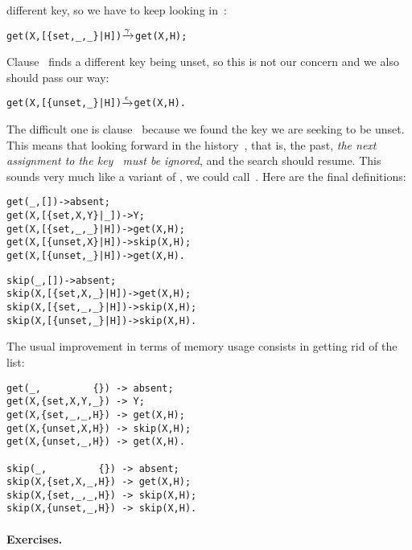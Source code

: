 different key, so we have to keep looking in~:
\begin{alltt}
get(X,[\{set,_,_\}|H]) \(\smashedrightarrow{\gamma}\) get(X,H);
\end{alltt}
Clause~\clause{\epsilon} finds a different key being unset, so this is
not our concern and we also should pass our way:
\begin{alltt}
get(X,[\{unset,_\}|H]) \(\smashedrightarrow{\epsilon}\) get(X,H).
\end{alltt}
The difficult one is clause~\clause{\delta} because we found the key
we are seeking to be unset. This means that looking forward in the
history~, that is, the past, \emph{the next assignment to
  the key~ must be ignored}, and the search should
resume. This sounds very much like a variant of , we
could call~. Here are the final definitions:
\begin{alltt}
get(_,           []) -> absent;
get(X,[\{set,X,Y\}|_]) -> Y;
get(X,[\{set,_,_\}|H]) -> get(X,H);
get(X,[\{unset,X\}|H]) -> skip(X,H);\hfill% \emph{Skip the next} set...
get(X,[\{unset,_\}|H]) -> get(X,H).

skip(_,           []) -> absent;
skip(X,[\{set,X,_\}|H]) -> get(X,H);
skip(X,[\{set,_,_\}|H]) -> skip(X,H);\hfill% \emph{...done.}
skip(X,[\{unset,_\}|H]) -> skip(X,H).
\end{alltt}
The usual improvement in terms of memory usage consists in getting rid
of the list:
\begin{verbatim}
get(_,         {}) -> absent;
get(X,{set,X,Y,_}) -> Y;
get(X,{set,_,_,H}) -> get(X,H);
get(X,{unset,X,H}) -> skip(X,H);
get(X,{unset,_,H}) -> get(X,H).

skip(_,         {}) -> absent;
skip(X,{set,X,_,H}) -> get(X,H);
skip(X,{set,_,_,H}) -> skip(X,H);
skip(X,{unset,_,H}) -> skip(X,H).
\end{verbatim}

\medskip

\paragraph{Exercises.}
\label{ex:persistence_and_backtracking}

